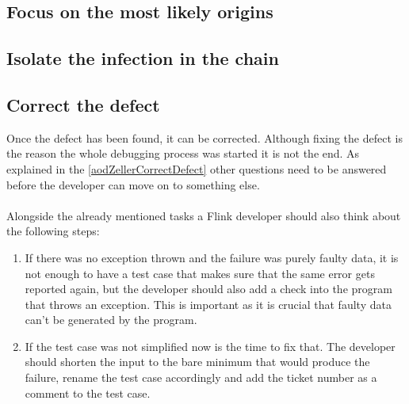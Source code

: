 \subsection{Focus on the most likely origins}

\subsection{Isolate the infection in the chain}

\subsection{Correct the defect}
Once the defect has been found, it can be corrected. Although fixing the defect is the reason the whole debugging process was started it is not the end. As explained in the \ref{aodZellerCorrectDefect} other questions need to be answered before the developer can move on to something else.

\paragraph{} Alongside the already mentioned tasks a Flink developer should also think about the following steps:
\begin{enumerate}
  \item If there was no exception thrown and the failure was purely faulty data, it is not enough to have a test case that makes sure that the same error gets reported again, but the developer should also add a check into the program that throws an exception. This is important as it is crucial that faulty data can't be generated by the program.
  \item If the test case was not simplified now is the time to fix that. The developer should shorten the input to the bare minimum that would produce the failure, rename the test case accordingly and add the ticket number as a comment to the test case.
\end{enumerate}


